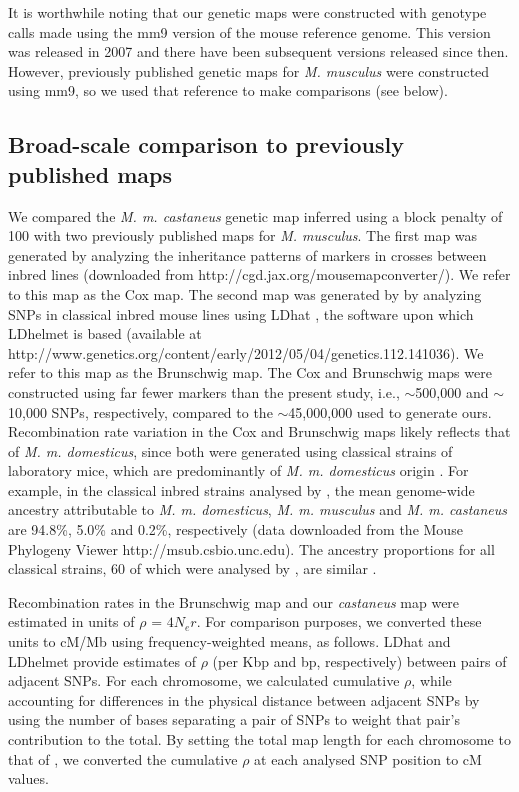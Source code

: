 It is worthwhile noting that our genetic maps were constructed with genotype calls made using the mm9 version of the mouse reference genome. This version was released in 2007 and there have been subsequent versions released since then. However, previously published genetic maps for \textit{M. musculus} were constructed using mm9, so we used that reference to make comparisons (see below).
 
\subsection{Broad-scale comparison to previously published maps}
 
We compared the \textit{M. m. castaneus} genetic map inferred using a block penalty of 100 with two previously published maps for \textit{M. musculus}. The first map was generated by analyzing the inheritance patterns of markers in crosses between inbred lines \citep{RN232} (downloaded from http://cgd.jax.org/mousemapconverter/). We refer to this map as the Cox map. The second map was generated by \cite{RN146} by analyzing SNPs in classical inbred mouse lines using LDhat \citep{RN260}, the software upon which LDhelmet is based (available at http://www.genetics.org/content/early/2012/05/04/genetics.112.141036). We refer to this map as the Brunschwig map. The Cox and Brunschwig maps were constructed using far fewer markers than the present study, i.e., $\sim$500,000 and $\sim$10,000 SNPs, respectively, compared to the $\sim$45,000,000 used to generate ours. Recombination rate variation in the Cox and Brunschwig maps likely reflects that of \textit{M. m. domesticus}, since both were generated using classical strains of laboratory mice, which are predominantly of \textit{M. m. domesticus} origin \citep{RN243}. For example, in the classical inbred strains analysed by \cite{RN213}, the mean genome-wide ancestry attributable to \textit{M. m. domesticus}, \textit{M. m. musculus} and \textit{M. m. castaneus} are 94.8\%, 5.0\% and 0.2\%, respectively (data downloaded from the Mouse Phylogeny Viewer \citep{RN280} http://msub.csbio.unc.edu). The ancestry proportions for all classical strains, 60 of which were analysed by \cite{RN156}, are similar \citep{RN243}.

Recombination rates in the Brunschwig map and our \textit{castaneus} map were estimated in units of $\rho$ = $4N_er$. For comparison purposes, we converted these units to cM/Mb using frequency-weighted means, as follows. LDhat and LDhelmet provide estimates of $\rho$ (per Kbp and bp, respectively) between pairs of adjacent SNPs. For each chromosome, we calculated cumulative $\rho$, while accounting for differences in the physical distance between adjacent SNPs by using the number of bases separating a pair of SNPs to weight that pair’s contribution to the total. By setting the total map length for each chromosome to that of \cite{RN232}, we converted the cumulative $\rho$ at each analysed SNP position to cM values.
 
